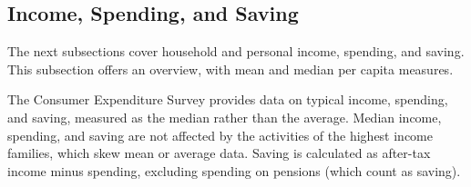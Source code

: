 \documentclass{report}
\begin{document}
{\subsection*{\color{black!70} \seriffont Income, Spending, and Saving}
\begin{minipage}{0.76\textwidth}
\small The next subsections cover household and personal income, spending, and saving. This subsection offers an overview, with mean and median per capita measures. 



The Consumer Expenditure Survey provides data on typical income, spending, and saving, measured as the median rather than the average. Median income, spending, and saving are not affected by the activities of the highest income families, which skew mean or average data. Saving is calculated as after-tax income minus spending, excluding spending on pensions (which count as saving). 
\end{minipage}
\vspace{2mm}

}
\end{document}

